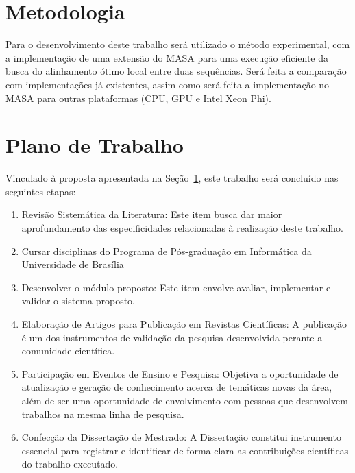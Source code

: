 \documentclass[12pt, a4paper]{article}
\numberwithin{table}{section}
\begin{document}
\section{Metodologia}
\label{sec:metodologia}

Para o desenvolvimento deste trabalho será utilizado o método experimental, 
com a implementação de uma extensão do MASA para uma execução eficiente 
da busca do alinhamento ótimo local entre duas sequências. 
Será feita a comparação com implementações já existentes,
assim como será feita a implementação no MASA para outras plataformas (CPU, GPU e Intel Xeon Phi).

\section{Plano de Trabalho}
\label{sec:plano}

Vinculado à proposta apresentada na Seção~\ref{sec:metodologia}, este trabalho 
será concluído nas seguintes etapas:

\begin{enumerate}
	\item Revisão Sistemática da Literatura: Este item busca dar maior aprofundamento
		das especificidades relacionadas à realização deste trabalho.
	\item Cursar disciplinas do Programa de Pós-graduação em Informática da Universidade
		de Brasília
	\item Desenvolver o módulo proposto: Este item envolve avaliar, implementar e validar
		o sistema proposto.
	\item Elaboração de Artigos para Publicação em Revistas Científicas: A
			publicação é um dos instrumentos de validação da pesquisa desenvolvida
			perante a comunidade científica.
	\item Participação em Eventos de Ensino e Pesquisa: Objetiva a oportunidade de
			atualização e geração de conhecimento acerca de temáticas novas da área,
			além de ser uma oportunidade de envolvimento com pessoas que desenvolvem
			trabalhos na mesma linha de pesquisa.
	\item Confecção da Dissertação de Mestrado: A Dissertação constitui instrumento essencial
			para registrar e identificar de forma clara as contribuições científicas do
			trabalho executado.
\end{enumerate}
\end{document}
